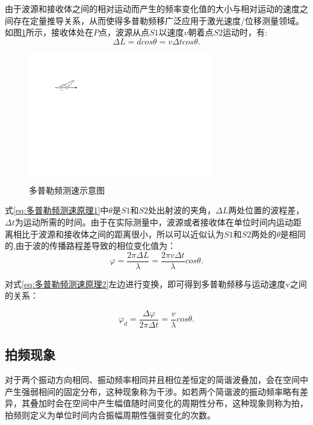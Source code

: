 由于波源和接收体之间的相对运动而产生的频率变化值的大小与相对运动的速度之间存在定量推导关系，从而使得多普勒频移广泛应用于激光速度/位移测量领域。如图\ref{fig:多普勒频测速示意图}所示，接收体处在\(P\)点，波源从点\(S1\)以速度\(v\)朝着点\(S2\)运动时，有:
\begin{equation}\label{eq:多普勒频测速原理1}
    \Delta L=dcos\theta=v\Delta tcos\theta.
\end{equation}
\begin{figure}[htb]
    \centering
    \includegraphics[width=8cm]{fig/2-fig/多普勒频测速示意图.drawio.pdf}
    \caption{多普勒频测速示意图}
    \label{fig:多普勒频测速示意图}
  \end{figure}

式\eqref{eq:多普勒频测速原理1}中\(\theta\)是\(S1\)和\(S2\)处出射波的夹角，\(\Delta L\)两处位置的波程差，\(\Delta t\)为运动所需的时间。由于在实际测量中，波源或者接收体在单位时间内运动距离相比于波源和接收体之间的距离很小，所以可以近似认为\(S1\)和\(S2\)两处的\(\theta\)是相同的\cite{百度百科-多普勒频移},由于波的传播路程差导致的相位变化值为：
\begin{equation}\label{eq:多普勒频测速原理2}
    \varphi=\frac{2\pi \Delta L}{\lambda}=\frac{2\pi v\Delta t}{\lambda}cos\theta.
\end{equation}


对式\eqref{eq:多普勒频测速原理2}左边进行变换，即可得到多普勒频移与运动速度v之间的关系：

\begin{equation}\label{eq:多普勒频测速原理3}
    \varphi_d=\frac{\Delta \varphi}{2\pi \Delta t}=\frac{v}{\lambda}cos\theta.
\end{equation}



\subsection{拍频现象}
对于两个振动方向相同、振动频率相同并且相位差恒定的简谐波叠加，会在空间中产生强弱相间的固定分布，这种现象称为干涉。如若两个简谐波的振动频率略有差异，其叠加时会在空间中产生幅值随时间变化的周期性分布，这种现象则称为拍\cite{基于拍频测量温度和旋光角的方法研究}，拍频则定义为单位时间内合振幅周期性强弱变化的次数。


